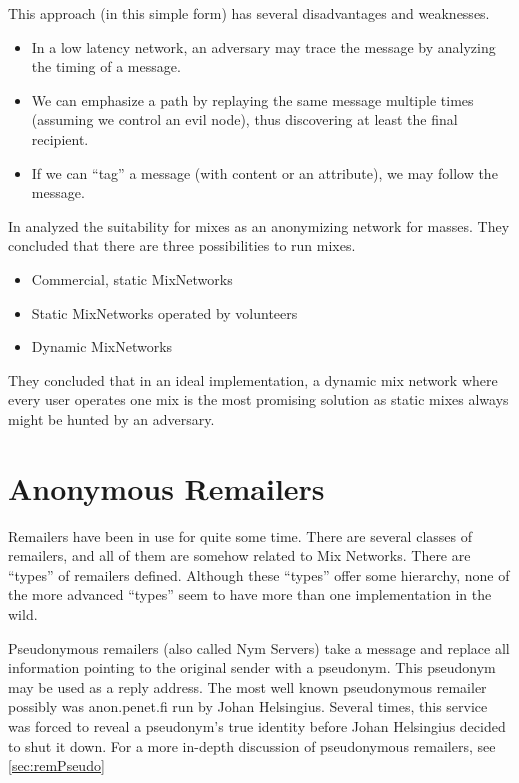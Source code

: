 This approach (in this simple form) has several disadvantages and weaknesses.

\begin{itemize}
	\item In a low latency network, an adversary may trace the message by analyzing the timing of a message.
	\item We can emphasize a path by replaying the same message multiple times (assuming we control an evil node), thus discovering at least the final recipient.
	\item If we can ``tag'' a message (with content or an attribute), we may follow the message.
\end{itemize}

In \citeyear{RP03-1} \citeauthor{RP03-1} analyzed the suitability for mixes as an anonymizing network for masses. They concluded that there are three possibilities to run mixes.
\begin{itemize}
	\item Commercial, static MixNetworks
	\item Static MixNetworks operated by volunteers
	\item Dynamic MixNetworks
\end{itemize}
They concluded that in an ideal implementation, a dynamic mix network where every user operates one mix is the most promising solution as static mixes always might be hunted by an adversary.

\section{Anonymous Remailers}\label{sec:remailers}
Remailers have been in use for quite some time. There are several classes of remailers, and all of them are somehow related to Mix Networks. There are ``types'' of remailers defined. Although these ``types'' offer some hierarchy, none of the more advanced ``types'' seem to have more than one implementation in the wild. 

Pseudonymous remailers (also called Nym Servers) take a message and replace all information pointing to the original sender with a pseudonym. This pseudonym may be used as a reply address. The most well known pseudonymous remailer possibly was anon.penet.fi run by Johan Helsingius. Several times, this service was forced to reveal a pseudonym's true identity before Johan Helsingius decided to shut it down. For a more in-depth discussion of pseudonymous remailers, see \ref{sec:remPseudo}

